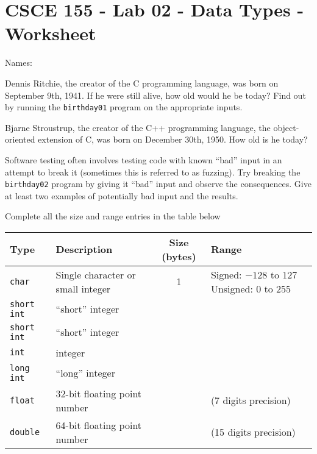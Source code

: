 \documentclass[12pt]{exam}
\begin{document}
\section*{CSCE 155 - Lab 02 - Data Types - Worksheet}

Names: \underline{\hspace{10cm}}

\begin{questions}

\question Dennis Ritchie, the creator of the C programming language,
was born on September 9th, 1941.  If he were still alive, how old
would he be today?  Find out by running the \texttt{birthday01}
program on the appropriate inputs.

\begin{solution}[1cm]
\end{solution}

\question Bjarne Stroustrup, the creator of the C++ programming
language, the object-oriented extension of C, was born on December
30th, 1950.  How old is he today?

\begin{solution}[1cm]
\end{solution}

\question Software testing often involves testing code with known
``bad'' input in an attempt to break it (sometimes this is referred
to as fuzzing).  Try breaking the \texttt{birthday02}
program by giving it ``bad'' input and observe the consequences.
Give at least two examples of potentially bad input and the results.

\begin{solution}[1cm]
\end{solution}

\question Complete all the size and range entries in the table below
\begin{table}[h]
\centering
\begin{tabular}{|l|l|c|p{4cm}|}
\hline
Type & Description & Size (bytes) & Range \\
\hline\hline
\texttt{char} & Single character or small integer & 1 &
 Signed: $-128$ to $127$
 Unsigned: 0 to 255 \\
\hline
\texttt{short int} & ``short'' integer & ~ &  \vspace{1cm}\\
\hline
\texttt{short int} & ``short'' integer & ~ &  \vspace{1cm}\\
\hline
\texttt{int} & integer & ~ &  \vspace{1cm}\\
\hline
\texttt{long int} & ``long'' integer & ~ &  \vspace{1cm}\\
\hline
\texttt{float} & 32-bit floating point number & ~ & (7 digits precision)\\
\hline
\texttt{double} & 64-bit floating point number & ~ & (15 digits precision)\\
\hline
\end{tabular}
\end{table}


\end{questions}
\end{document}
